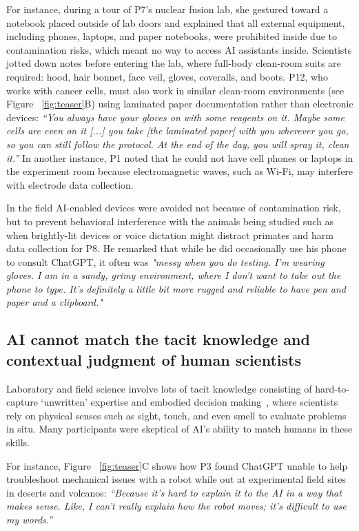 For instance, during a tour of P7's nuclear fusion lab, she gestured toward a notebook placed outside of lab doors and explained that all external equipment, including phones, laptops, and paper notebooks, were prohibited inside due to contamination risks, which meant no way to access AI assistants inside. Scientists jotted down notes before entering the lab, where full-body clean-room suits are required: hood, hair bonnet, face veil, gloves, coveralls, and boots. P12, who works with cancer cells, must also work in similar clean-room environments (see Figure ~\ref{fig:teaser}B) using laminated paper documentation rather than electronic devices: \textit{``You always have your gloves on with some reagents on it. Maybe some cells are even on it [...] you take [the laminated paper] with you wherever you go, so you can still follow the protocol. At the end of the day, you will spray it, clean it.''} In another instance, P1 noted that he could not have cell phones or laptops in the experiment room because electromagnetic waves, such as Wi-Fi, may interfere with electrode data collection.

In the field AI-enabled devices were avoided not because of contamination risk, but to prevent behavioral interference with the animals being studied such as when brightly-lit devices or voice dictation might distract primates and harm data collection for P8. He remarked that while he did occasionally use his phone to consult ChatGPT, it often was \textit{"messy when you do testing. I'm wearing gloves. I am in a sandy, grimy environment, where I don't want to take out the phone to type. It's definitely a little bit more rugged and reliable to have pen and paper and a clipboard."}

\subsection{AI cannot match the tacit knowledge and contextual judgment of human scientists}

Laboratory and field science involve lots of tacit knowledge consisting of hard-to-capture `unwritten' expertise and embodied decision making~\cite{polanyi2009tacit}, where scientists rely on physical senses such as sight, touch, and even smell to evaluate problems in situ. Many participants were skeptical of AI’s ability to match humans in these skills.

For instance, Figure ~\ref{fig:teaser}C shows how P3 found ChatGPT unable to help troubleshoot mechanical issues with a robot while out at experimental field sites in deserts and volcanos: \textit{``Because it's hard to explain it to the AI in a way that makes sense. Like, I can't really explain how the robot moves; it's difficult to use my words.''}

